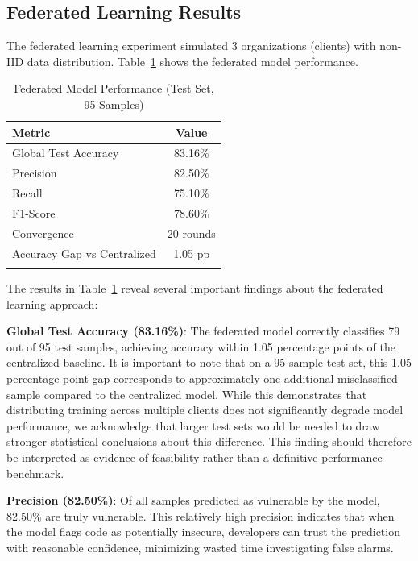 \documentclass[pdflatex,sn-mathphys-num]{sn-jnl}
\theoremstyle{thmstyleone}%
\theoremstyle{thmstyletwo}%
\theoremstyle{thmstylethree}%
\begin{document}
\subsection{Federated Learning Results}\label{subsec:flresults}

The federated learning experiment simulated 3 organizations (clients) with non-IID data distribution. Table~\ref{tab:federated} shows the federated model performance.

\begin{table}[h]
\caption{Federated Model Performance (Test Set, 95 Samples)}\label{tab:federated}
\begin{tabular}{lc}
\toprule
\textbf{Metric} & \textbf{Value} \\ 
\midrule
Global Test Accuracy & 83.16\% \\
Precision & 82.50\% \\
Recall & 75.10\% \\
F1-Score & 78.60\% \\
\midrule
Convergence & 20 rounds \\
Accuracy Gap vs Centralized & 1.05 pp \\
\botrule
\end{tabular}
\end{table}

The results in Table~\ref{tab:federated} reveal several important findings about the federated learning approach:

\textbf{Global Test Accuracy (83.16\%)}: The federated model correctly classifies 79 out of 95 test samples, achieving accuracy within 1.05 percentage points of the centralized baseline. It is important to note that on a 95-sample test set, this 1.05 percentage point gap corresponds to approximately one additional misclassified sample compared to the centralized model. While this demonstrates that distributing training across multiple clients does not significantly degrade model performance, we acknowledge that larger test sets would be needed to draw stronger statistical conclusions about this difference. This finding should therefore be interpreted as evidence of feasibility rather than a definitive performance benchmark.

\textbf{Precision (82.50\%)}: Of all samples predicted as vulnerable by the model, 82.50\% are truly vulnerable. This relatively high precision indicates that when the model flags code as potentially insecure, developers can trust the prediction with reasonable confidence, minimizing wasted time investigating false alarms.
\end{document}
